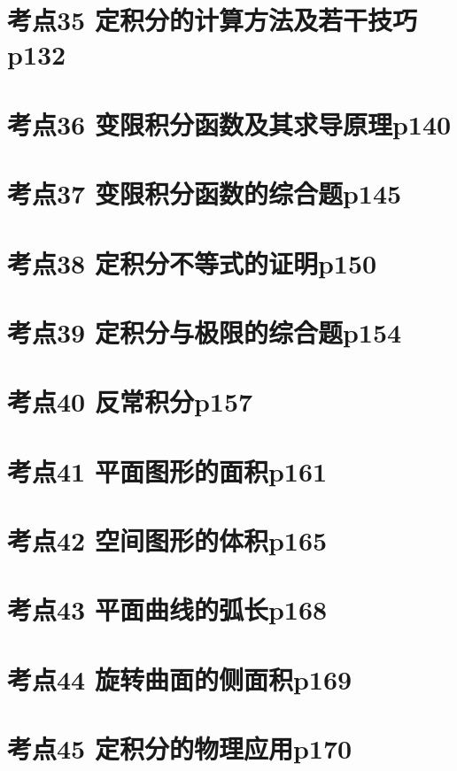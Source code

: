 \section{考点35 定积分的计算方法及若干技巧p132}

\section{考点36 变限积分函数及其求导原理p140}

\section{考点37 变限积分函数的综合题p145}

\section{考点38 定积分不等式的证明p150}

\section{考点39 定积分与极限的综合题p154}

\section{考点40 反常积分p157}

\section{考点41 平面图形的面积p161}

\section{考点42 空间图形的体积p165}

\section{考点43 平面曲线的弧长p168}

\section{考点44 旋转曲面的侧面积p169}

\section{考点45 定积分的物理应用p170}

